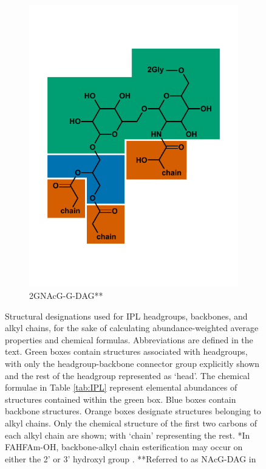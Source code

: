 {\begin{figure}[h]
\begin{subfigure}[b]{.3\linewidth}
        \includegraphics[width=\linewidth]{figs_ch1/2GNAcG-G-DAG}
    	\caption{2GNAcG-G-DAG**}
        \label{fig:2GNAcG-G-DAG}
    \end{subfigure}

    
\caption[Structural designations used for IPL headgroups, backbones, and alkyl chains]{Structural designations used for IPL headgroups, backbones, and alkyl chains, for the sake of calculating abundance-weighted average properties and chemical formulas. Abbreviations are defined in the text. Green boxes contain  structures associated with headgroups, with only the headgroup-backbone connector group explicitly shown and the rest of the headgroup represented as `head'. The chemical formulae in Table \ref{tab:IPL} represent elemental abundances of structures contained within the green box. Blue boxes contain backbone structures. Orange boxes designate structures belonging to alkyl chains. Only the chemical structure of the first two carbons of each alkyl chain are shown; with `chain' representing the rest. *In FAHFAm-OH, backbone-alkyl chain esterification may occur on either the 2' or 3' hydroxyl group \citep{diercks2015accumulation}. **Referred to as NAcG-DAG in \cite{schubotz2013spatial}}
\label{fig:IPLdivision}
\end{figure}
\doublespace
\clearpage
}


